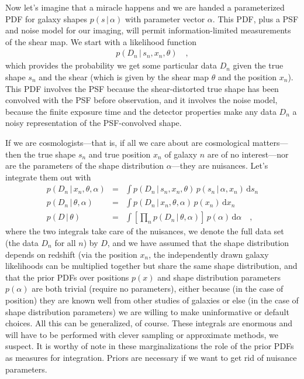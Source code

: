 \documentclass[12pt, pdftex]{article}
\newcommand{\dd}{\mathrm{d}}
\newcommand{\given}{\,|\,}
\newcommand{\shearpars}{\theta}
\newcommand{\position}{x}
\newcommand{\data}{D}
\newcommand{\shape}{s}
\newcommand{\shapepars}{\alpha}
\begin{document}
Now let's imagine that a miracle happens and we are handed a
parameterized PDF for galaxy shapes $p(\shape\given\shapepars)$ with
parameter vector $\shapepars$.  This PDF, plus a PSF and noise model
for our imaging, will permit information-limited measurements of the
shear map.  We start with a likelihood function
\begin{eqnarray}\displaystyle
p(\data_n\given\shape_n,\position_n,\shearpars)
\quad ,
\end{eqnarray}
which provides the probability we get some particular data $\data_n$
given the true shape $\shape_n$ and the shear (which is given by the
shear map $\shearpars$ and the position $\position_n$).  This PDF
involves the PSF because the shear-distorted true shape has been
convolved with the PSF before observation, and it involves the noise
model, because the finite exposure time and the detector properties
make any data $\data_n$ a noisy representation of the PSF-convolved
shape.

If we are cosmologists---that is, if all we care about are
cosmological matters---then the true shape $\shape_n$ and true
position $\position_n$ of galaxy $n$ are of no interest---nor are the
parameters of the shape distribution $\shapepars$---they are
nuisances.  Let's integrate them out with
\begin{eqnarray}\displaystyle
p(\data_n\given\position_n,\shearpars,\shapepars) &=&
\int p(\data_n\given\shape_n,\position_n,\shearpars)\,p(\shape_n\given\shapepars,\position_n)\,\dd\shape_n
\\
p(\data_n\given\shearpars,\shapepars) &=&
\int p(\data_n\given\position_n,\shearpars,\shapepars)\,p(\position_n)\,\dd\position_n
\\
p(\data\given\shearpars) &=&
\int \left[\prod_n p(\data_n\given\shearpars,\shapepars)\right]\,p(\shapepars)\,\dd\shapepars
\quad ,
\end{eqnarray}
where the two integrals take care of the nuisances, we denote the full
data set (the data $\data_n$ for all $n$) by $\data$, and we have
assumed that the shape distribution depends on redshift (via the
position $\position_n$, the independently drawn galaxy likelihoods can
be multiplied together but share the same shape distribution, and that
the prior PDFs over positions $p(\position)$ and shape distribution
parameters $p(\shapepars)$ are both trivial (require no parameters),
either because (in the case of position) they are known well from
other studies of galaxies or else (in the case of shape distribution
parameters) we are willing to make uninformative or default choices.
All this can be generalized, of course.  These integrals are enormous
and will have to be performed with clever sampling or approximate
methods, we suspect.  It is worthy of note in these marginalizations
the role of the prior PDFs as measures for integration.  Priors are
necessary if we want to get rid of nuisance parameters.
\end{document}
